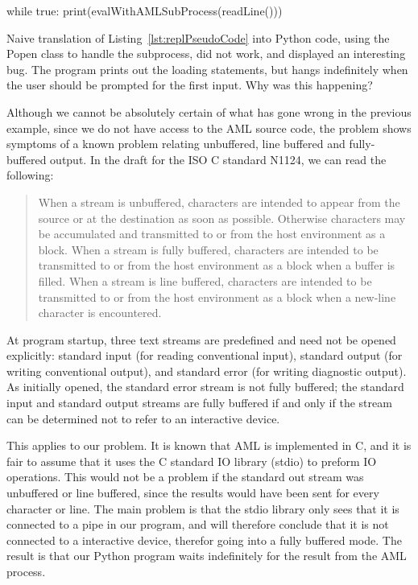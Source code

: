 \begin{python}[caption={Pseudo-code for a AML REPL application},label={lst:replPseudoCode}]
while true:
    print(evalWithAMLSubProcess(readLine()))
\end{python}

Naive translation of Listing~\ref{lst:replPseudoCode} into Python code, using the Popen class to handle the subprocess, did not work, and displayed an interesting bug. The program prints out the loading statements, but hangs indefinitely when the user should be prompted for the first input. Why was this happening?

Although we cannot be absolutely certain of what has gone wrong in the previous example, since we do not have access to the AML source code, the problem shows symptoms of a known problem relating unbuffered, line buffered and fully-buffered output. In the draft for the ISO C standard N1124, we can read the following:

\begin{quote}
When a stream is unbuffered, characters are intended to appear from the source or at the destination as soon as possible. Otherwise characters may be accumulated and transmitted to or from the host environment as a block. When a stream is fully buffered, characters are intended to be transmitted to or from the host environment as a block when a buffer is filled. When a stream is line buffered, characters are intended to be transmitted to or from the host environment as a block when a new-line character is encountered. \cite{N1124}
\end{quote}

At program startup, three text streams are predefined and need not be opened explicitly: standard input (for reading conventional input), standard output (for writing conventional output), and standard error (for writing diagnostic output). As initially opened, the standard error stream is not fully buffered; the standard input and standard output streams are fully buffered if and only if the stream can be determined not to refer to an interactive device.

This applies to our problem. It is known that AML is implemented in C, and it is fair to assume that it uses the C standard IO library (stdio) to preform IO operations. This would not be a problem if the standard out stream was unbuffered or line buffered, since the results would have been sent for every character or line. The main problem is that the stdio library only sees that it is connected to a pipe in our program, and will therefore conclude that it is not connected to a interactive device, therefor going into a fully buffered mode. The result is that our Python program waits indefinitely for the result from the AML process.

